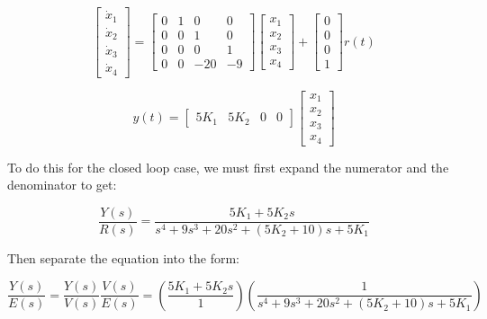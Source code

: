 \documentclass[12pt, letterpaper]{../assignment}
\begin{document}
\begin{answer}
    \begin{equation*}
        \begin{bmatrix}
            \dot{x}_1\\ \dot{x}_2\\ \dot{x}_3\\ \dot{x}_4
        \end{bmatrix}=
        \begin{bmatrix}
            0 & 1 & 0 & 0 \\
            0 & 0 & 1 & 0 \\
            0 & 0 & 0 & 1 \\
            0 & 0 & -20 & -9
        \end{bmatrix}
        \begin{bmatrix}
            x_1\\ x_2\\ x_3\\ x_4
        \end{bmatrix}
        + \begin{bmatrix}
            0\\ 0\\ 0\\ 1
        \end{bmatrix} r(t)
    \end{equation*}
\end{answer}
\begin{answer}
    \begin{equation*}
        y(t)=
        \begin{bmatrix}
            5 K_1 & 5 K_2 & 0 & 0
        \end{bmatrix}
        \begin{bmatrix}
            x_1\\ x_2\\ x_3\\ x_4
        \end{bmatrix}
    \end{equation*}
\end{answer}

To do this for the closed loop case, we must first expand the numerator and the denominator to get:

$$ \frac{Y(s)}{R(s)} = \frac{5 K_1 + 5 K_2 s}{s^4 + 9 s^3 + 20 s^2 + (5 K_2 + 10) s + 5 K_1} $$

Then separate the equation into the form:

$$ \frac{Y(s)}{E(s)} = \frac{Y(s)}{V(s)} \frac{V(s)}{E(s)} = \left(\frac{5 K_1 + 5 K_2 s}{1}\right) \left(\frac{1}{s^4 + 9 s^3 + 20 s^2 + (5 K_2 + 10) s + 5 K_1}\right) $$
\end{document}
